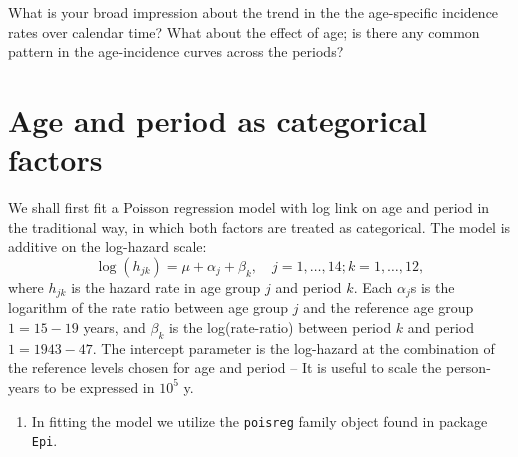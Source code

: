 \documentclass[
]{book}
\newenvironment{Shaded}{\begin{snugshade}}{\end{snugshade}}
\newcommand{\AttributeTok}[1]{\textcolor[rgb]{0.13,0.29,0.53}{#1}}
\newcommand{\DecValTok}[1]{\textcolor[rgb]{0.00,0.00,0.81}{#1}}
\newcommand{\FunctionTok}[1]{\textcolor[rgb]{0.13,0.29,0.53}{\textbf{#1}}}
\newcommand{\NormalTok}[1]{#1}
\newcommand{\OtherTok}[1]{\textcolor[rgb]{0.56,0.35,0.01}{#1}}
\newcommand{\SpecialCharTok}[1]{\textcolor[rgb]{0.81,0.36,0.00}{\textbf{#1}}}
\providecommand{\tightlist}{%
  \setlength{\itemsep}{0pt}\setlength{\parskip}{0pt}}
\theoremstyle{definition}
\theoremstyle{definition}
\theoremstyle{definition}
\theoremstyle{definition}
\theoremstyle{remark}
\begin{document}
What is your broad impression about the trend in the the age-specific
incidence rates over calendar time? What about the effect of age; is
there any common pattern in the age-incidence curves across the periods?

\section{Age and period as categorical factors}\label{age-and-period-as-categorical-factors}

We shall first fit a Poisson regression model with log link on age and
period in the traditional way, in which both factors are treated as
categorical. The model is additive on the log-hazard scale:
\[ \log(h_{jk}) = \mu + \alpha_j + \beta_k, \quad j=1, \dots, 14; k=1, \dots, 12, \]
where \(h_{jk}\) is the hazard rate in age group \(j\) and period \(k\). Each
\(\alpha_j\)s is the logarithm of the rate ratio between age group \(j\) and
the reference age group \(1 = 15-19\) years, and \(\beta_k\) is the
log(rate-ratio) between period \(k\) and period \(1 = 1943-47\). The
intercept parameter is the log-hazard at the combination of the
reference levels chosen for age and period -- It is useful to scale the
person-years to be expressed in \(10^5\) y.

\begin{enumerate}
\def\labelenumi{\arabic{enumi}.}
\tightlist
\item
  In fitting the model we utilize the \texttt{poisreg} family object found in
  package \texttt{Epi}.
\end{enumerate}

\begin{Shaded}
\end{Shaded}
\end{document}
